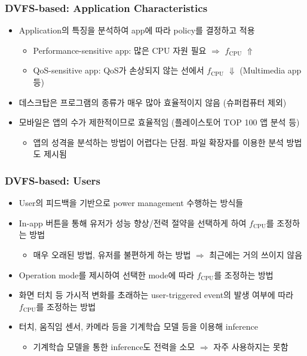 \subsubsection*{DVFS-based: Application Characteristics}
\begin{itemize}
    \item Application의 특징을 분석하여 app에 따라 policy를 결정하고 적용
    \begin{itemize}
        \item Performance-sensitive app: 많은 CPU 자원 필요 $\Rightarrow$ $f_{\mathrm{CPU}}$ $\Uparrow$
        \item QoS-sensitive app: QoS가 손상되지 않는 선에서 $f_{\mathrm{CPU}}$ $\Downarrow$ (Multimedia app 등)
    \end{itemize}
    \item 데스크탑은 프로그램의 종류가 매우 많아 효율적이지 않음 (슈퍼컴퓨터 제외)
    \item 모바일은 앱의 수가 제한적이므로 효율적임 (플레이스토어 TOP 100 앱 분석 등)
    \begin{itemize}
        \item 앱의 성격을 분석하는 방법이 어렵다는 단점. 파일 확장자를 이용한 분석 방법도 제시됨
    \end{itemize}
\end{itemize}

\subsubsection*{DVFS-based: Users}
\begin{itemize}
    \item User의 피드백을 기반으로 power management 수행하는 방식들
    \item In-app 버튼을 통해 유저가 성능 향상/전력 절약을 선택하게 하여 $f_{\mathrm{CPU}}$를 조정하는 방법
    \begin{itemize}
        \item 매우 오래된 방법, 유저를 불편하게 하는 방법 $\Rightarrow$ 최근에는 거의 쓰이지 않음
    \end{itemize}
    \item Operation mode를 제시하여 선택한 mode에 따라 $f_{\mathrm{CPU}}$를 조정하는 방법
    \item 화면 터치 등 가시적 변화를 초래하는 user-triggered event의 발생 여부에 따라 $f_{\mathrm{CPU}}$를 조정하는 방법
    \item 터치, 움직임 센서, 카메라 등을 기계학습 모델 등을 이용해 inference
    \begin{itemize}
        \item 기계학습 모델을 통한 inference도 전력을 소모 $\Rightarrow$ 자주 사용하지는 못함
    \end{itemize}
\end{itemize}

